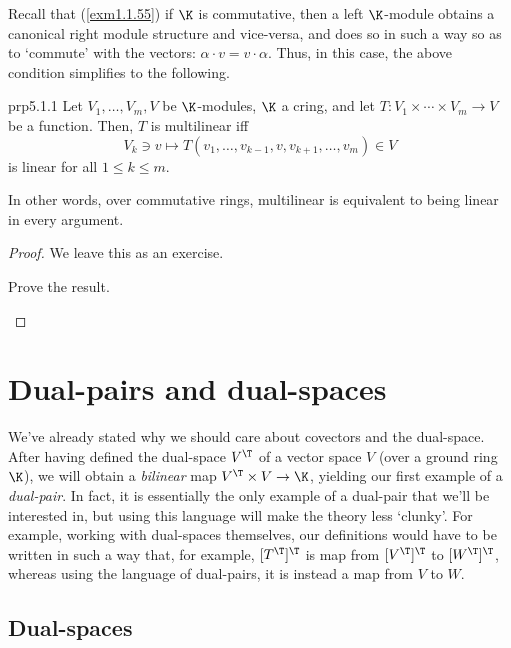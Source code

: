 Recall that (\cref{exm1.1.55}) if $\K$ is commutative, then a left $\K$-module obtains a canonical right module structure and vice-versa, and does so in such a way so as to `commute' with the vectors:  $\alpha \cdot v=v\cdot \alpha$.  Thus, in this case, the above condition simplifies to the following.
\begin{prp}{}{prp5.1.1}
	Let $V_1,\ldots ,V_m,V$ be $\K$-modules, $\K$ a cring, and let $T\colon V_1\times \cdots \times V_m\rightarrow V$ be a function.  Then, $T$ is multilinear iff
	\begin{equation}
		V_k\ni v\mapsto T(v_1,\ldots ,v_{k-1},v,v_{k+1},\ldots ,v_m)\in V
	\end{equation}
	is linear for all $1\leq k\leq m$.
	\begin{rmk}
		In other words, over commutative rings, multilinear is equivalent to being linear in every argument.
	\end{rmk}
	\begin{proof}
		We leave this as an exercise.
		\begin{exr}[breakable=false]{}{}
			Prove the result.
		\end{exr}
	\end{proof}
\end{prp}

\section{Dual-pairs and dual-spaces}

We've already stated why we should care about covectors and the dual-space.  After having defined the dual-space $V^{\T}$ of a vector space $V$ (over a ground ring $\K$), we will obtain a \emph{bilinear} map $V^{\T}\times V\rightarrow \K$, yielding our first example of a \emph{dual-pair}.  In fact, it is essentially the only example of a dual-pair that we'll be interested in, but using this language will make the theory less `clunky'.  For example, working with dual-spaces themselves, our definitions would have to be written in such a way that, for example, $[T^{\T}]^{\T}$ is map from $[V^{\T}]^{\T}$ to $[W^{\T}]^{\T}$, whereas using the language of dual-pairs, it is instead a map from $V$ to $W$.

\subsection{Dual-spaces}

